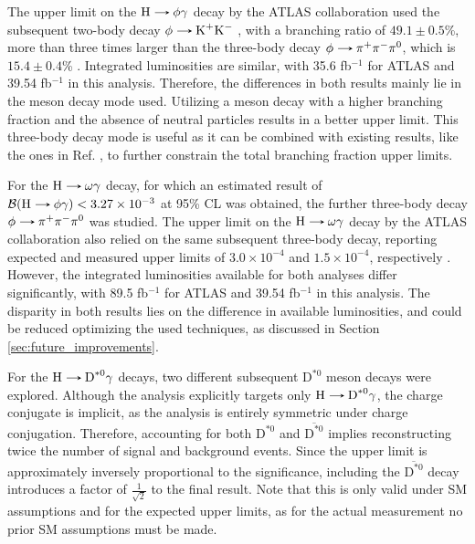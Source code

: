The upper limit on the $\text{H}\decaysto \phi\gamma$ decay by the ATLAS collaboration used the subsequent two-body decay $\phi\decaysto \text{K}^+\text{K}^-$ \cite{ATLAS:2017gko}, with a branching ratio of $49.1\pm0.5$\%, more than three times larger than the three-body decay $\phi\decaysto \pi^+\pi^-\pi^0$, which is $15.4\pm0.4$\% \cite{PDG}. Integrated luminosities are similar, with 35.6 fb$^{-1}$ for ATLAS and 39.54 fb$^{-1}$ in this analysis. Therefore, the differences in both results mainly lie in the meson decay mode used. Utilizing a meson decay with a higher branching fraction and the absence of neutral particles results in a better upper limit. This three-body decay mode is useful as it can be combined with existing results, like the ones in Ref. \cite{ATLAS:2017gko}, to further constrain the total branching fraction upper limits.

For the $\text{H}\decaysto \omega\gamma$ decay, for which an estimated result of $\mathcal{B}(\text{H}\decaysto \phi\gamma) < 3.27 \times 10^{-3}$ at 95\% CL was obtained, the further three-body decay $\phi\decaysto \pi^+\pi^-\pi^0$ was studied. The upper limit on the $\text{H}\decaysto \omega\gamma$ decay by the ATLAS collaboration also relied on the same subsequent three-body decay, reporting expected and measured upper limits of $3.0 \times 10^{-4}$ and $1.5 \times 10^{-4}$, respectively \cite{ATLAS:2023alf}. However, the integrated luminosities available for both analyses differ significantly, with 89.5 fb$^{-1}$ for ATLAS and 39.54 fb$^{-1}$ in this analysis. The disparity in both results lies on the difference in available luminosities, and could be reduced optimizing the used techniques, as discussed in Section \ref{sec:future_improvements}.

For the $\text{H}\decaysto \text{D}^{*0}\gamma$ decays, two different subsequent $\text{D}^{*0}$ meson decays were explored. Although the analysis explicitly targets only $\text{H}\decaysto \text{D}^{*0}\gamma$, the charge conjugate is implicit, as the analysis is entirely symmetric under charge conjugation. Therefore, accounting for both $\text{D}^{*0}$ and $\overline{\text{D}^{*0}}$ implies reconstructing twice the number of signal and background events. Since the upper limit is approximately inversely proportional to the significance, including the $\overline{\text{D}^{*0}}$ decay introduces a factor of $\frac{1}{\sqrt{2}}$ to the final result. Note that this is only valid under SM assumptions and for the expected upper limits, as for the actual measurement no prior SM assumptions must be made.

